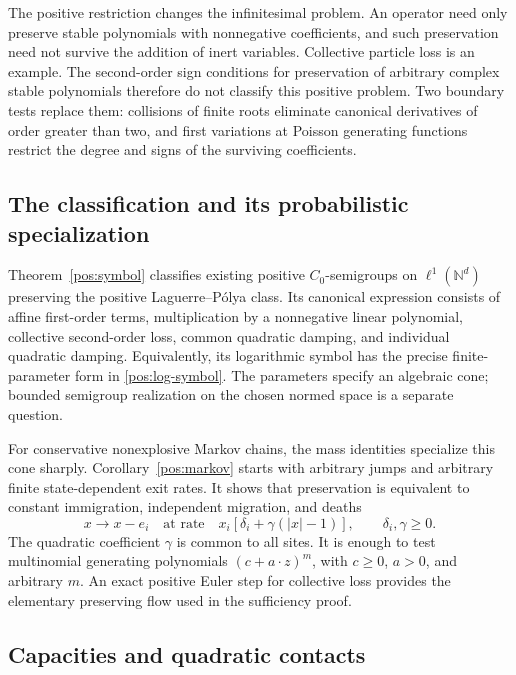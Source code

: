 \documentclass[reqno]{amsart}
\theoremstyle{definition}
\theoremstyle{remark}
\newcommand{\N}{\mathbb N}
\begin{document}
The positive restriction changes the infinitesimal problem. An operator
need only preserve stable polynomials with nonnegative coefficients,
and such preservation need not survive the addition of inert variables.
Collective particle loss is an example. The second-order sign conditions
for preservation of arbitrary complex stable polynomials therefore do
not classify this positive problem. Two boundary tests replace them:
collisions of finite roots eliminate canonical derivatives of order
greater than two, and first variations at Poisson generating functions
restrict the degree and signs of the surviving coefficients.

\subsection{The classification and its probabilistic specialization}

Theorem~\ref{pos:symbol} classifies existing positive
\(C_0\)-semigroups on \(\ell^1(\N^d)\) preserving the positive
Laguerre--P\'olya class. Its canonical expression consists of affine
first-order terms, multiplication by a nonnegative linear polynomial,
collective second-order loss, common quadratic damping, and individual
quadratic damping. Equivalently, its logarithmic symbol has the precise
finite-parameter form in \eqref{pos:log-symbol}. The parameters specify
an algebraic cone; bounded semigroup realization on the chosen normed
space is a separate question.

For conservative nonexplosive Markov chains, the mass identities
specialize this cone sharply. Corollary~\ref{pos:markov} starts with
arbitrary jumps and arbitrary finite state-dependent exit rates. It
shows that preservation is equivalent to constant immigration,
independent migration, and deaths
\[
 x\longrightarrow x-e_i
 \quad\text{at rate}\quad x_i[\delta_i+\gamma(|x|-1)],
 \qquad \delta_i,\gamma\ge0.
\]
The quadratic coefficient \(\gamma\) is common to all sites. It is
enough to test multinomial generating polynomials
\((c+a\cdot z)^m\), with \(c\ge0\), \(a>0\), and arbitrary \(m\).
An exact positive Euler step for collective loss provides the elementary
preserving flow used in the sufficiency proof.

\subsection{Capacities and quadratic contacts}
\end{document}
